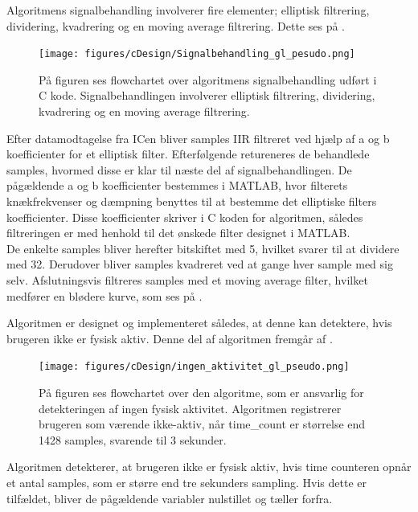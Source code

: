 Algoritmens signalbehandling involverer fire elementer; elliptisk filtrering, dividering, kvadrering og en moving average filtrering. Dette ses på .
\begin{figure}[H]
	\centering
	\texttt{[image: figures/cDesign/Signalbehandling\_gl\_pesudo.png]}
	\caption{På figuren ses flowchartet over algoritmens signalbehandling udført i C kode. Signalbehandlingen involverer elliptisk filtrering, dividering, kvadrering og en moving average filtrering.}
	\label{fig:signalbehandling_g_l}
\end{figure} \vspace{-0.5cm}
Efter datamodtagelse fra ICen bliver samples IIR filtreret ved hjælp af a og b koefficienter for et elliptisk filter. Efterfølgende retureneres de behandlede samples, hvormed disse er klar til næste del af signalbehandlingen. De pågældende a og b koefficienter bestemmes i MATLAB, hvor filterets knækfrekvenser og dæmpning benyttes til at bestemme det elliptiske filters koefficienter. Disse koefficienter skriver i C koden for algoritmen, således filtreringen er med henhold til det ønskede filter designet i MATLAB.\\
De enkelte samples bliver herefter bitskiftet med 5, hvilket svarer til at dividere med 32. Derudover bliver samples kvadreret ved at gange hver sample med sig selv. Afslutningsvis filtreres samples med et moving average filter, hvilket medfører en blødere kurve, som ses på .

Algoritmen er designet og implementeret således, at denne kan detektere, hvis brugeren ikke er fysisk aktiv. Denne del af algoritmen fremgår af .
\begin{figure}[H]
	\centering
	\texttt{[image: figures/cDesign/ingen\_aktivitet\_gl\_pseudo.png]}
	\caption{På figuren ses flowchartet over den algoritme, som er ansvarlig for detekteringen af ingen fysisk aktivitet. Algoritmen registrerer brugeren som værende ikke-aktiv, når time\_count er størrelse end 1428 samples, svarende til 3 sekunder.}
	\label{fig:ingen_ak_pseudo}
\end{figure} \vspace{-0.5cm}
Algoritmen detekterer, at brugeren ikke er fysisk aktiv, hvis time counteren opnår et antal samples, som er større end tre sekunders sampling. Hvis dette er tilfældet, bliver de pågældende variabler nulstillet og tæller forfra.

